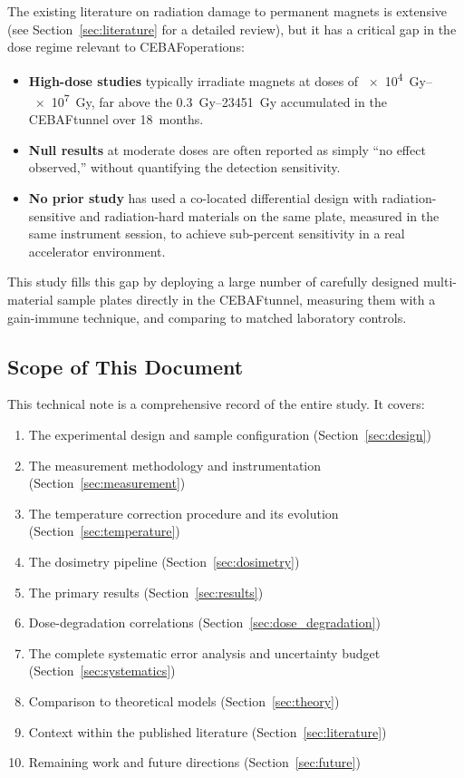 \documentclass[11pt,letterpaper]{article}
\newcommand{\CEBAF}{CEBAF}
\begin{document}
The existing literature on radiation damage to permanent magnets is extensive
(see Section~\ref{sec:literature} for a detailed review), but it has a critical
gap in the dose regime relevant to \CEBAF operations:

\begin{itemize}
    \item \textbf{High-dose studies} \cite{Simos2018,Bizen2016,Alderman}
    typically irradiate magnets at doses of
    \SIrange{e4}{e7}{Gy}, far above the \SIrange{0.3}{23451}{Gy} accumulated
    in the \CEBAF tunnel over 18~months.
    \item \textbf{Null results} at moderate doses are often reported as simply
    ``no effect observed,'' without quantifying the detection sensitivity.
    \item \textbf{No prior study} has used a co-located differential design
    with radiation-sensitive and radiation-hard materials on the same plate,
    measured in the same instrument session, to achieve sub-percent sensitivity
    in a real accelerator environment.
\end{itemize}

This study fills this gap by deploying a large number of carefully designed
multi-material sample plates directly in the \CEBAF tunnel, measuring them with
a gain-immune technique, and comparing to matched laboratory controls.

\subsection{Scope of This Document}

This technical note is a comprehensive record of the entire study. It covers:

\begin{enumerate}
    \item The experimental design and sample configuration (Section~\ref{sec:design})
    \item The measurement methodology and instrumentation (Section~\ref{sec:measurement})
    \item The temperature correction procedure and its evolution (Section~\ref{sec:temperature})
    \item The dosimetry pipeline (Section~\ref{sec:dosimetry})
    \item The primary results (Section~\ref{sec:results})
    \item Dose-degradation correlations (Section~\ref{sec:dose_degradation})
    \item The complete systematic error analysis and uncertainty budget (Section~\ref{sec:systematics})
    \item Comparison to theoretical models (Section~\ref{sec:theory})
    \item Context within the published literature (Section~\ref{sec:literature})
    \item Remaining work and future directions (Section~\ref{sec:future})
\end{enumerate}
\end{document}
